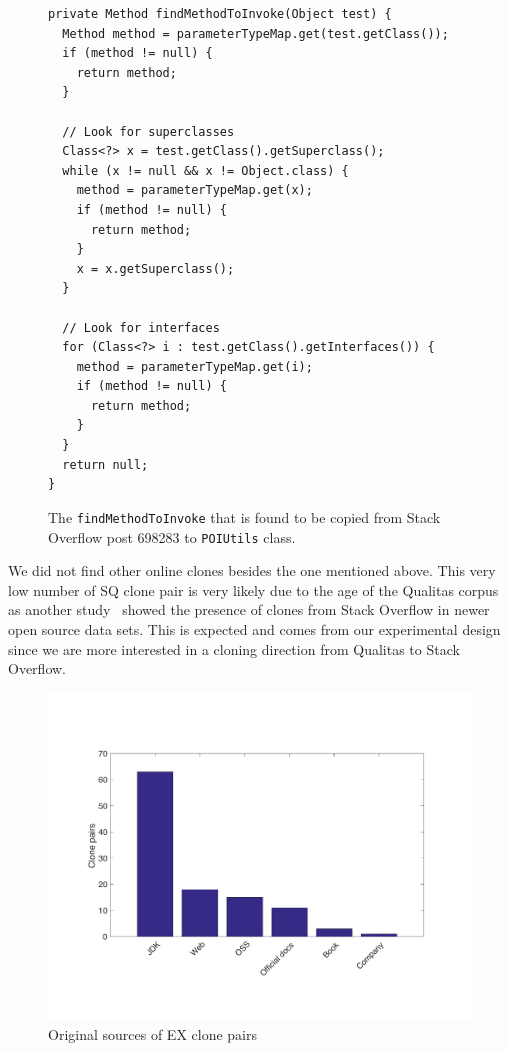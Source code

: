\documentclass[10pt,journal,compsoc]{IEEEtran}
\begin{document}
\begin{figure}
	\begin{lstlisting}
private Method findMethodToInvoke(Object test) {
  Method method = parameterTypeMap.get(test.getClass());
  if (method != null) {
    return method;
  }

  // Look for superclasses
  Class<?> x = test.getClass().getSuperclass();
  while (x != null && x != Object.class) {
    method = parameterTypeMap.get(x);
    if (method != null) {
      return method;
    }
    x = x.getSuperclass();
  }

  // Look for interfaces
  for (Class<?> i : test.getClass().getInterfaces()) {
    method = parameterTypeMap.get(i);
    if (method != null) {
      return method;
    }
  }
  return null;
}
	\end{lstlisting}\vspace{-2ex}
	\caption{The {\small\texttt{findMethodToInvoke}} that is found to be copied from Stack Overflow post 698283 to {\small\texttt{POIUtils}} class.}
	\label{fig:jstock_code}
\end{figure}

We did not find other online clones besides the one mentioned above. 
This very low number of SQ clone pair is very likely due to the age of the
Qualitas corpus as another study~\cite{An2017} showed the presence of clones
from Stack Overflow in newer open source data sets. This is expected and
comes from our experimental design since
we are more interested in a cloning direction from Qualitas to Stack Overflow.

\begin{figure}
	\centering
	\includegraphics[width=0.9\linewidth]{ex_sources}
	\caption{Original sources of EX clone pairs}
	\label{fig:ex_sources}
\end{figure}
\end{document}
